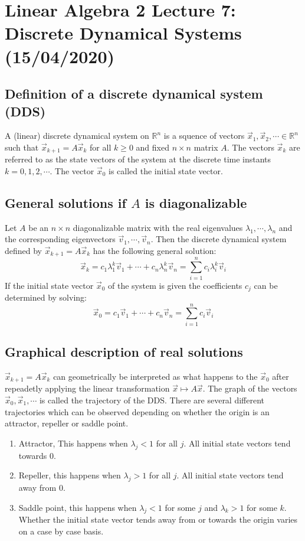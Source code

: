 \documentclass[11pt, a4paper]{article}
\newcommand*{\R}{\ensuremath{\mathbb{R}}}
\begin{document}
\setcounter{equation}{0}
\setcounter{section}{6}
\section{Linear Algebra 2 Lecture 7: Discrete Dynamical Systems (15/04/2020)}


\subsection{Definition of a discrete dynamical system (DDS)}
A (linear) discrete dynamical system on $\R^n$ is a squence of vectors $\vec{x}_1, \vec{x}_2, \cdots \in \R^n$ such that $\vec{x}_{k+1}=A\vec{x}_k$ for all $k \geq 0$ and fixed $n \times n$ matrix $A$. The vectors $\vec{x}_k$ are referred to as the state vectors of the system at the discrete time instants $k=0,1,2,\cdots$. The vector $\vec{x}_0$ is called the initial state vector.


\subsection{General solutions if $A$ is diagonalizable}
Let $A$ be an $n \times n$ diagonalizable matrix with the real eigenvalues $\lambda_1, \cdots, \lambda_n$ and the corresponding eigenvectors $\vec{v}_1,\cdots,\vec{v}_n$. Then the discrete dynamical system defined by $\vec{x}_{k+1} = A\vec{x}_k$ has the following general solution:
\begin{equation}
  \vec{x}_k = c_1 \lambda_1^k \vec{v}_1 + \cdots + c_n \lambda_n^k \vec{v}_n = \sum_{i=1}^{n} c_i \lambda_i^k \vec{v}_i
\end{equation}
If the initial state vector $\vec{x}_0$ of the system is given the coefficients $c_j$ can be determined by solving:
\begin{equation}
  \vec{x}_0 = c_1 \vec{v}_1 + \cdots + c_n \vec{v}_n = \sum_{i=1}^{n} c_i \vec{v}_i
\end{equation}


\subsection{Graphical description of real solutions}
$\vec{x}_{k+1} = A \vec{x}_k$ can geometrically be interpreted as what happens to the $\vec{x}_0$ after repeadetly applying the linear transformation $\vec{x} \mapsto A\vec{x}$. The graph of the vectors $\vec{x}_0, \vec{x}_1, \cdots$ is called the trajectory of the DDS. There are several different trajectories which can be observed depending on whether the origin is an attractor, repeller or saddle point.
\begin{enumerate}[label=\alph*]
  \item Attractor, This happens when $\lambda_j < 1$ for all $j$. All initial state vectors tend towards $0$.
  \item Repeller, this happens when $\lambda_j > 1$ for all $j$. All initial state vectors tend away from $0$.
  \item Saddle point, this happens when $\lambda_j < 1$ for some $j$ and $\lambda_k > 1$ for some $k$. Whether the initial state vector tends away from or towards the origin varies on a case by case basis.
\end{enumerate}
\end{document}
